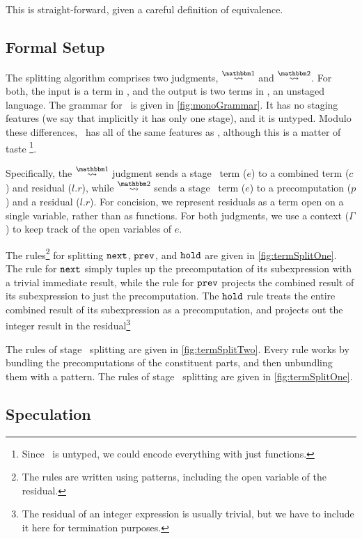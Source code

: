 This is straight-forward, given a careful definition of equivalence.

\subsection {Formal Setup}

The splitting algorithm comprises two judgments, $\splitonesym$ and $\splittwosym$.
For both, the input is a term in \lang, and the output is two terms in \langmono, an
unstaged language.  The grammar for \langmono\ is given in \ref{fig:monoGrammar}.  It has no
staging features (we say that implicitly it has only one stage), and it is untyped.  
Modulo these differences, \langmono\ has all of the same features as \lang, 
although this is a matter of taste
\footnote{Since \langmono\ is untyped, we could encode everything with just functions.}.

Specifically, the $\splitonesym$ judgment sends a stage \bbone\ term ($e$) to a combined term ($c$) and residual ($l.r$),
while $\splittwosym$ sends a stage \bbtwo\ term ($e$) to a precomputation ($p$) and a residual ($l.r$).
For concision, we represent residuals as a term open on a single variable, rather than as functions.
For both judgments, we use a context ($\Gamma$) to keep track of the open variables of $e$.

The rules\footnote{The rules are written using patterns, including the open variable of the residual.} 
for splitting ${\tt next}$, ${\tt prev}$, and ${\tt hold}$ are given in \ref{fig:termSplitOne}.
The rule for ${\tt next}$ simply tuples up the precomputation of its subexpression with a trivial immediate result,
while the rule for ${\tt prev}$ projects the combined result of its subexpression to just the precomputation.
The ${\tt hold}$ rule treats the entire combined result of its subexpression as a precomputation, 
and projects out the integer result in the residual\footnote{The residual of an integer expression is usually trivial, 
but we have to include it here for termination purposes.}

The rules of stage \bbtwo\ splitting are given in \ref{fig:termSplitTwo}.  
Every rule works by bundling the precomputations of the constituent parts, and then unbundling them with a pattern.
The rules of stage \bbone\ splitting are given in \ref{fig:termSplitOne}.  


\subsection {Speculation}

